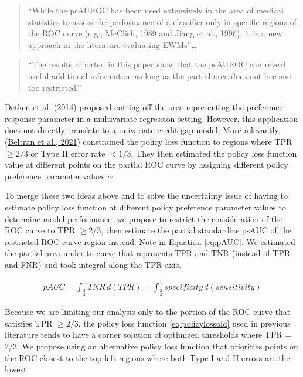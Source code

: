 \documentclass[
  12pt,
]{article}
\begin{document}
\begin{quote}
``While the psAUROC has been used extensively in the area of medical statistics to assess the performance of a classifier only in specific regions of the ROC curve (e.g., McClish, 1989 and Jiang et al., 1996), it is a new approach in the literature evaluating EWMs''\ldots{}
\end{quote}

\begin{quote}
``The results reported in this paper show that the psAUROC can reveal useful additional information as long as the partial area does not become too restricted.''
\end{quote}

Detken et al. (\protect\hyperlink{ref-detken_operationalising_2014}{2014}) proposed cutting off the area representing the preference response parameter in a multivariate regression setting. However, this application does not directly translate to a univariate credit gap model. More relevantly, (\protect\hyperlink{ref-beltran_optimizing_2021}{Beltran et al., 2021}) constrained the policy loss function to regions where TPR \(\ge 2/3\) or Type II error rate \(< 1/3\). They then estimated the policy loss function value at different points on the partial ROC curve by assigning different policy preference parameter values \(\alpha\).

To merge these two ideas above and to solve the uncertainty issue of having to estimate policy loss function at different policy preference parameter values to determine model performance, we propose to restrict the consideration of the ROC curve to TPR \(\ge 2/3\), then estimate the partial standardize psAUC of the restricted ROC curve region instead. Note in Equation \eqref{eq:pAUC}. We estimated the partial area under to curve that represents TPR and TNR (instead of TPR and FNR) and took integral along the TPR axis.

\begin{align} \label{eq:pAUC}
pAUC = \int_{\frac{2}{3}}^1 TNR \, d(TPR) = \int_{\frac{2}{3}}^1 specificity \, d(sensitivity)
\end{align}

Because we are limiting our analysis only to the portion of the ROC curve that satisfies TPR \(\ge 2/3\), the policy loss function \eqref{eq:policylossold} used in previous literature tends to have a corner solution of optimized thresholds where TPR = 2/3. We propose using an alternative policy loss function that priorities points on the ROC closest to the top left regions where both Type I and II errors are the lowest:
\end{document}
